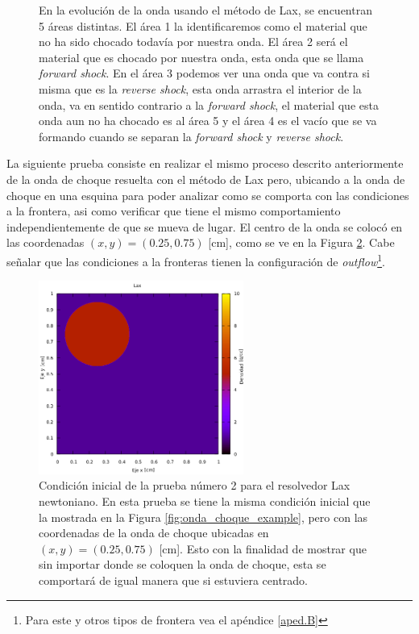 \documentclass[12pt,a4paper]{book}
\begin{document}
\begin{figure}
\caption{\label{fig:Lax-newtoniano-prueba1-analisis}En la evolución de la onda usando el método de Lax,  se encuentran 5 áreas distintas. El área 1 la identificaremos como el material que no ha sido chocado todavía por nuestra onda. El área 2 será el material que es chocado por nuestra onda, esta onda que se llama \emph{forward shock}. En el área 3 podemos ver una onda que va contra si misma que es la \emph{reverse shock}, esta onda arrastra el interior de la onda, va en sentido contrario a la \emph{forward shock}, el material que esta onda aun no ha chocado es al área 5 y el área 4 es el vacío que se va formando cuando se separan la \emph{forward shock} y \emph{reverse shock}.} 
\end{figure}


La siguiente prueba consiste en realizar el mismo proceso descrito anteriormente de la onda de choque resuelta con 
el método de Lax pero, ubicando a la onda de choque en una esquina para poder analizar como se comporta con las condiciones a la frontera, 
asi como verificar que tiene el mismo comportamiento independientemente de que se mueva de lugar. 
El centro de la onda se colocó en las coordenadas $(x, y) = (0.25, 0.75)$ [cm], como se ve en la Figura \ref{fig:onda_choque2_t_0}. 
Cabe señalar que las condiciones a la fronteras tienen la configuración de
\textit{outflow}\footnote{Para este y otros tipos de frontera vea el apéndice \ref{aped.B}}.

\begin{figure} 
\centering
\includegraphics[width=0.6\textwidth]{./Figuras/Pruebas/Prueba_onda_choque/onda_choque2_t_0}
\caption{\label{fig:onda_choque2_t_0}Condición inicial de la prueba número 2 para el resolvedor Lax newtoniano. En esta prueba se tiene la misma condición inicial que la mostrada en la Figura \ref{fig:onda_choque_example}, pero con las coordenadas de la onda de choque ubicadas en $(x, y) = (0.25, 0.75)$ [cm]. Esto con la finalidad de mostrar que sin importar donde se coloquen la onda de choque, esta se comportará de igual manera que si estuviera centrado.} 
\end{figure}
\end{document}
